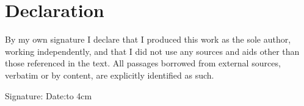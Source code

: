 \chapter*{Declaration}

By my own signature I declare that I produced this work as the sole author, working independently, and that I did not use any sources and aids other than those referenced in the text.
All passages borrowed from external sources, verbatim or by content, are explicitly identified as such.

\vspace{3em}
Signature:\dotfill\hspace{1em}
Date:\hbox to 4cm{\dotfill}
